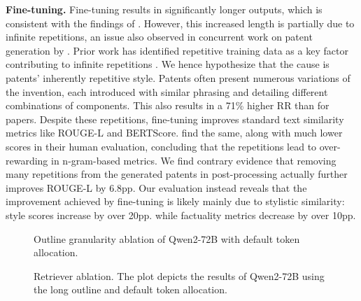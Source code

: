 \noindent\textbf{Fine-tuning. }
Fine-tuning results in significantly longer outputs, which is consistent with the findings of \citet{baiLongWriterUnleashing102024}.
However, this increased length is partially due to infinite repetitions, an issue also observed in concurrent work on patent generation by \citet{wangAutoPatentMultiAgentFramework2024}.
Prior work has identified repetitive training data as a key factor contributing to infinite repetitions \cite{liRepetitionRepetitionOut2023}.
We hence hypothesize that the cause is patents' inherently repetitive style.
Patents often present numerous variations of the invention, each introduced with similar phrasing and detailing different combinations of components.
This also results in a 71\% higher RR than for papers.
Despite these repetitions, fine-tuning improves standard text similarity metrics like ROUGE-L and BERTScore.
\citet{wangAutoPatentMultiAgentFramework2024} find the same, along with much lower scores in their human evaluation, concluding that the repetitions lead to over-rewarding in n-gram-based metrics.
We find contrary evidence that removing many repetitions from the generated patents in post-processing actually further improves ROUGE-L by 6.8pp.
Our evaluation instead reveals that the improvement achieved by fine-tuning is likely mainly due to stylistic similarity: style scores increase by over 20pp. while factuality metrics decrease by over 10pp.


\begin{figure}[t]
  
  \caption{
    Outline granularity ablation of Qwen2-72B with default token allocation. 
  }
  \label{fig:granularity}
\end{figure}

\begin{figure}[t]
  \centering
  \resizebox{\linewidth}{!}{
    
  }
  \caption{Retriever ablation. The plot depicts the results of Qwen2-72B using the long outline and default token allocation.}
  \label{fig:retrievers}
\end{figure}